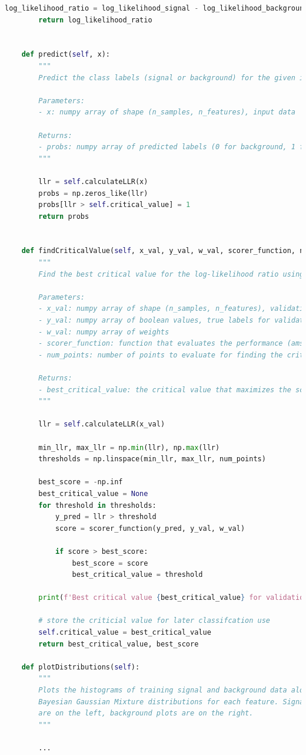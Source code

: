 \begin{lstlisting}[language=Python]
        log_likelihood_ratio = log_likelihood_signal - log_likelihood_background
        return log_likelihood_ratio

    
    def predict(self, x):
        """
        Predict the class labels (signal or background) for the given input data.

        Parameters:
        - x: numpy array of shape (n_samples, n_features), input data

        Returns:
        - probs: numpy array of predicted labels (0 for background, 1 for signal)
        """
        
        llr = self.calculateLLR(x)
        probs = np.zeros_like(llr)
        probs[llr > self.critical_value] = 1
        return probs
        

    def findCriticalValue(self, x_val, y_val, w_val, scorer_function, num_points=100):
        """
        Find the best critical value for the log-likelihood ratio using validation data.

        Parameters:
        - x_val: numpy array of shape (n_samples, n_features), validation data
        - y_val: numpy array of boolean values, true labels for validation data
        - w_val: numpy array of weights
        - scorer_function: function that evaluates the performance (ams_scorer)
        - num_points: number of points to evaluate for finding the critical value

        Returns:
        - best_critical_value: the critical value that maximizes the scorer function
        """
        
        llr = self.calculateLLR(x_val)

        min_llr, max_llr = np.min(llr), np.max(llr)
        thresholds = np.linspace(min_llr, max_llr, num_points)

        best_score = -np.inf
        best_critical_value = None
        for threshold in thresholds:
            y_pred = llr > threshold
            score = scorer_function(y_pred, y_val, w_val)

            if score > best_score:
                best_score = score
                best_critical_value = threshold

        print(f'Best critical value {best_critical_value} for validation score: {best_score}')

        # store the criticial value for later classifcation use
        self.critical_value = best_critical_value
        return best_critical_value, best_score

    def plotDistributions(self):
        """
        Plots the histograms of training signal and background data along with the fitted
        Bayesian Gaussian Mixture distributions for each feature. Signal plots
        are on the left, background plots are on the right.
        """
        
        ...

\end{lstlisting}


